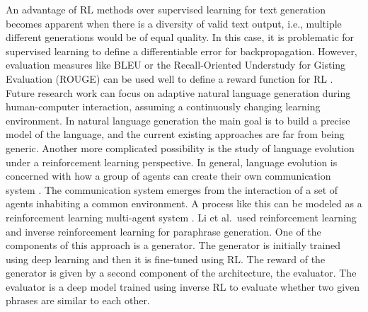 An advantage of RL methods over supervised learning for text generation becomes apparent when there is a diversity of valid text output, i.e., multiple different generations would be of equal quality. In this case, it is problematic for supervised learning to define a differentiable error for backpropagation. However, evaluation measures like BLEU or the Recall-Oriented Understudy for Gisting Evaluation (ROUGE) can be used well to define a reward function for RL . Future research work can focus on adaptive natural language generation during human-computer interaction, assuming a continuously changing learning environment. In natural language generation the main goal is to build a precise model of the language, and the current existing approaches are far from being generic.
Another more complicated possibility is the study of language evolution under a reinforcement learning perspective. In general, language evolution is concerned with how a group of agents can create their own communication system . The communication system emerges from the interaction of a set of agents inhabiting a common environment. A process like this can be modeled as a reinforcement learning multi-agent system .
Li et al.\  used reinforcement learning and inverse reinforcement learning for paraphrase generation. One of the components of this approach is a generator. The generator is initially trained using deep learning and then it is fine-tuned using RL. The reward of the generator is given by a second component of the architecture, the evaluator. The evaluator is a deep model trained using inverse RL to evaluate whether two given phrases are similar to each other.

